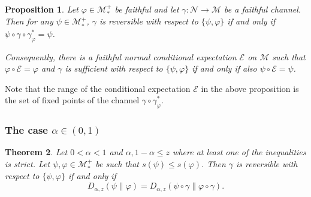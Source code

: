 \documentclass[12pt]{article}
\newtheorem{theorem}{Theorem}[section]
\newtheorem{prop}[theorem]{Proposition}
\theoremstyle{definition}
\theoremstyle{remark}
\numberwithin{equation}{section}
\def\Me{\mathcal M}
\def\Ne{\mathcal N}
\begin{document}
\begin{prop}\label{prop:universal} Let $\varphi\in \Me_*^+$ be faithful and let 
$\gamma:\Ne\to \Me$ be a faithful channel. Then for any $\psi\in \Me_*^+$, $\gamma$ is
reversible with respect to $\{\psi,\varphi\}$ if and only if $\psi\circ\gamma\circ
\gamma_\varphi^*=\psi$.

Consequently, there is a faithful normal conditional expectation $\mathcal E$ on $\Me$
such that $\varphi\circ \mathcal E=\varphi$ and $\gamma$ is sufficient with respect to
$\{\psi,\varphi\}$ if and only if also $\psi\circ\mathcal E=\psi$.

\end{prop}

Note that the range of the conditional expectation $\mathcal E$ in the above proposition
is the set  of fixed points of the channel $\gamma\circ\gamma_\varphi^*$. 

\subsubsection{The case $\alpha\in (0,1)$}

\begin{theorem}\label{thm:suff<1} Let $0<\alpha<1$ and $\alpha,1-\alpha\le
z$ where at least one of the inequalities is strict. Let $\psi,\varphi\in \Me_*^+$ be
such that $s(\psi)\le s(\varphi)$.
Then $\gamma$ is reversible with respect to
$\{\psi,\varphi\}$ if and only if
\[
D_{\alpha,z}(\psi\|\varphi)=D_{\alpha,z}(\psi\circ\gamma\|\varphi\circ\gamma).
\]

\end{theorem}
\end{document}
